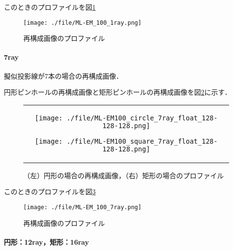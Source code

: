 \documentclass[dvipdfmx,autodetect-engine,twocolumn,10pt]{jsarticle}%
\begin{document}
このときのプロファイルを図\ref{reconst1_profile}
\begin{figure}[htbp]
  \begin{center}
    \texttt{[image: ./file/ML-EM\_100\_1ray.png]}
    \caption{再構成画像のプロファイル}
  \label{reconst1_profile}
  \end{center}
\end{figure}

\newpage
\paragraph{7ray}

擬似投影線が7本の場合の再構成画像．

円形ピンホールの再構成画像と矩形ピンホールの再構成画像を図\ref{reconst7}に示す．
\begin{figure}[htbp]
  \begin{center}
    \begin{tabular}{c}
      \begin{minipage}{0.5\hsize}
        \begin{center}
          \texttt{[image: ./file/ML-EM100\_circle\_7ray\_float\_128-128-128.png]}
        \end{center}
      \end{minipage}
      \begin{minipage}{0.5\hsize}
        \begin{center}
          \texttt{[image: ./file/ML-EM100\_square\_7ray\_float\_128-128-128.png]}
        \end{center}
      \end{minipage}
    \end{tabular}
  \caption{（左）円形の場合の再構成画像，（右）矩形の場合のプロファイル}
  \label{reconst7}
  \end{center}
\end{figure}

このときのプロファイルを図\ref{reconst7_profile}
\begin{figure}[htbp]
  \begin{center}
    \texttt{[image: ./file/ML-EM\_100\_7ray.png]}
    \caption{再構成画像のプロファイル}
  \label{reconst7_profile}
  \end{center}
\end{figure}

\paragraph{円形：12ray，矩形：16ray}
\end{document}
